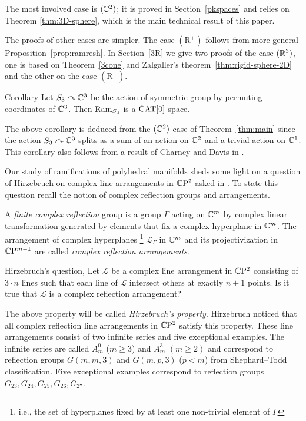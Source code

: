 \documentclass[oneside,a4paper]{article}
\def\Ram{\mathop{\rm Ram}\nolimits}
\begin{document}
The most involved case is $(\mathbb{C}^2)$;
it is proved in Section~\ref{pkspaces} 
and relies on Theorem \ref{thm:3D-sphere},
which is the main technical result of this paper.

The proofs of other cases are simpler.
The case $(\mathrm{R}^+)$ follows from more general Proposition~\ref{prop:ramresh}.
In Section~\ref{3R}
we give two proofs of the case $(\mathbb{R}^3)$, one is based on Theorem~\ref{3cone} and Zalgaller's theorem~\ref{thm:rigid-sphere-2D}
and the other on the case $(\mathrm{R}^+)$.

\begin{thm}{Corollary}\label{cor:braid}
Let $S_3\curvearrowright\mathbb{C}^3$ be the action of symmetric group by permuting coordinates of $\mathbb{C}^3$.
Then $\Ram_{S_3}$ is a $\mathrm{CAT}[0]$ space.
\end{thm}

The above corollary is deduced from the $(\mathbb{C}^2)$-case of Theorem~\ref{thm:main}
since the action $S_3\curvearrowright\mathbb{C}^3$ splits as a sum of an action on $\mathbb{C}^2$ and a trivial action on $\mathbb{C}^1$.
This corollary also follows from a result of Charney and Davis in \cite{charney-davis-93}.


Our study of ramifications of polyhedral manifolds sheds  some light on a question of Hirzebruch on complex line arrangements in $\mathbb{C}\mathrm{P}^2$ asked in \cite{Hirzebruch}. To state this question recall the notion of complex reflection groups and arrangements. 

A {\it finite complex reflection} group is a group $\Gamma$ acting on $\mathbb{C}^m$ by complex linear transformation generated by elements that fix a complex hyperplane in $\mathbb{C}^m$. 
The arrangement of complex hyperplanes%
\footnote{i.e., the set of hyperplanes fixed by at least one non-trivial element of $\Gamma$} 
 $\mathcal{L}_\Gamma$ in $\mathbb{C}^m$ and its projectivization in $\mathbb{C}\mathrm{P}^{m-1}$ are called {\it complex reflection arrangements}.

\begin{thm}{Hirzebruch's question, \cite{Hirzebruch}} Let  $\mathcal{L}$ be a complex line arrangement in $\mathbb{C}\mathrm{P}^2$ consisting of $3\cdot n$ lines such that each line of $\mathcal{L}$ intersect others at exactly $n+1$ points. 
Is it true that $\mathcal{L}$ is a complex reflection arrangement?
\end{thm}
The above property will be called {\it Hirzebruch's property}.
Hirzebruch noticed that all complex reflection line arrangements in $\mathbb{C}\mathrm{P}^2$ satisfy this property. These line arrangements consist of two infinite series and five exceptional examples. 
The infinite series are called $A_m^0$ ($m\ge 3$) and $A_m^3$ $(m\ge 2)$ and correspond to reflection groups $G(m,m,3)$ and $G(m,p,3)$ ($p<m$) from Shephard--Todd classification. 
Five  exceptional examples correspond to reflection groups $G_{23}, G_{24}, G_{25}, G_{26}, G_{27}$. 
\end{document}
